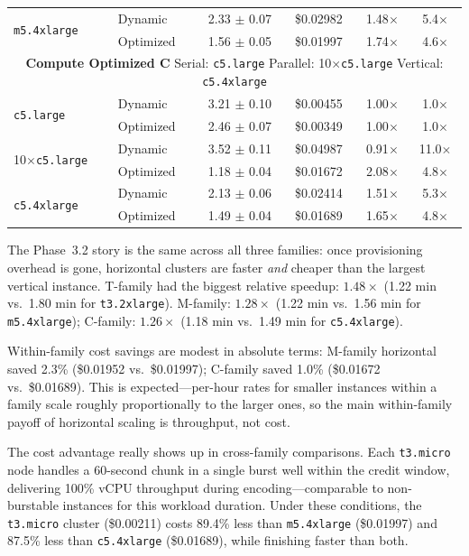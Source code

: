 \documentclass[conference]{IEEEtran}
\begin{document}
\begin{table}[!htbp]
\begin{tabular}{llcccc}
\multirow{2}{*}{\texttt{m5.4xlarge}}    & Dynamic   & 2.33 $\pm$ 0.07 & \$0.02982 & 1.48$\times$ & 5.4$\times$ \\
                                         & Optimized & 1.56 $\pm$ 0.05 & \$0.01997 & 1.74$\times$ & 4.6$\times$ \\
\midrule
\multicolumn{6}{c}{\textbf{Compute Optimized C} \quad Serial: \texttt{c5.large} \quad Parallel: 10$\times$\texttt{c5.large} \quad Vertical: \texttt{c5.4xlarge}} \\
\midrule
\multirow{2}{*}{\texttt{c5.large}}      & Dynamic   & 3.21 $\pm$ 0.10 & \$0.00455 & 1.00$\times$ & 1.0$\times$ \\
                                         & Optimized & 2.46 $\pm$ 0.07 & \$0.00349 & 1.00$\times$ & 1.0$\times$ \\
\multirow{2}{*}{10$\times$\texttt{c5.large}} & Dynamic   & 3.52 $\pm$ 0.11 & \$0.04987 & 0.91$\times$ & 11.0$\times$ \\
                                         & Optimized & 1.18 $\pm$ 0.04 & \$0.01672 & 2.08$\times$ & 4.8$\times$ \\
\multirow{2}{*}{\texttt{c5.4xlarge}}    & Dynamic   & 2.13 $\pm$ 0.06 & \$0.02414 & 1.51$\times$ & 5.3$\times$ \\
                                         & Optimized & 1.49 $\pm$ 0.04 & \$0.01689 & 1.65$\times$ & 4.8$\times$ \\
\bottomrule
\end{tabular}
\end{table}

The Phase~3.2 story is the same across all three families: once provisioning overhead is gone, horizontal clusters are faster \emph{and} cheaper than the largest vertical instance. T-family had the biggest relative speedup: $1.48\times$ (1.22 min vs.\ 1.80 min for \texttt{t3.2xlarge}). M-family: $1.28\times$ (1.22 min vs.\ 1.56 min for \texttt{m5.4xlarge}); C-family: $1.26\times$ (1.18 min vs.\ 1.49 min for \texttt{c5.4xlarge}).

Within-family cost savings are modest in absolute terms: M-family horizontal saved 2.3\% (\$0.01952 vs.\ \$0.01997); C-family saved 1.0\% (\$0.01672 vs.\ \$0.01689). This is expected---per-hour rates for smaller instances within a family scale roughly proportionally to the larger ones, so the main within-family payoff of horizontal scaling is throughput, not cost.

The cost advantage really shows up in cross-family comparisons. Each \texttt{t3.micro} node handles a 60-second chunk in a single burst well within the credit window, delivering 100\% vCPU throughput during encoding---comparable to non-burstable instances for this workload duration. Under these conditions, the \texttt{t3.micro} cluster (\$0.00211) costs 89.4\% less than \texttt{m5.4xlarge} (\$0.01997) and 87.5\% less than \texttt{c5.4xlarge} (\$0.01689), while finishing faster than both.
\end{document}
